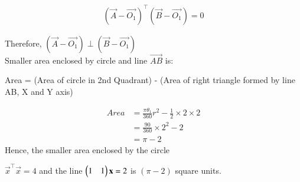 \documentclass[journal,12pt,twocolumn]{IEEEtran}
\begin{document}
\begin{align}
    (\vec{A} - \vec{O_1})^\top(\vec{B} - \vec{O_1}) = 0
\end{align}

Therefore, $(\vec{A} - \vec{O_1}) \perp (\vec{B} - \vec{O_1})$ \\

Smaller area enclosed by circle and line $\vec{AB}$ is: 

Area = (Area of circle in 2nd Quadrant) - (Area of right triangle formed by line AB, X and Y axis)

\begin{align}
    Area &= \frac{\pi\theta_1}{360}r^2 - \frac{1}{2}\times2\times2 \\
    &= \frac{90}{360}\times2^2 - 2 \\
    &= \pi - 2
\end{align}
Hence, the smaller area enclosed by the circle 

$\vec{x}^\top\vec{x}=4$ and the line $\begin{pmatrix}1 & 1\end{pmatrix}\mathbf{x}=2$ is $(\pi - 2)$ square units.
\end{document}
